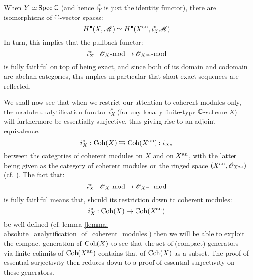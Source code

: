         \begin{corollary} \label{coro: GAGA_cohomological_comparison}
            When $Y \simeq \operatorname{Spec} \mathbb{C}$ (and hence $i_Y^*$ is just the identity functor), there are isomorphisms of $\mathbb{C}$-vector spaces:
                $$H^{\bullet}(X, \mathscr{M}) \simeq H^{\bullet}(X^{\mathrm{an}}, i_X^*\mathscr{M})$$
            In turn, this implies that the pullback functor:
                $$i_X^*: \mathscr{O}_X\text{-}\mathrm{mod} \to \mathscr{O}_{X^{\mathrm{an}}}\text{-}\mathrm{mod}$$
            is fully faithful on top of being exact, and since both of its domain and codomain are abelian categories, this implies in particular that short exact sequences are reflected. 
        \end{corollary}

        We shall now see that when we restrict our attention to coherent modules only, the module analytification functor $i_X^*$ (for any locally finite-type $\mathbb{C}$-scheme $X$) will furthermore be essentially surjective, thus giving rise to an adjoint equivalence:
            $$i_X^*: \mathrm{Coh}(X) \leftrightarrows \mathrm{Coh}(X^{\mathrm{an}}): i_{X *}$$
        between the categories of coherent modules on $X$ and on $X^{\mathrm{an}}$, with the latter being given as the category of coherent modules on the ringed space $(X^{\mathrm{an}}, \mathscr{O}_{X^{\mathrm{an}}})$ (cf. \cite[\href{https://stacks.math.columbia.edu/tag/01BU}{Tag 01BU}]{stacks-project}). The fact that:
            $$i_X^*: \mathscr{O}_X\text{-}\mathrm{mod} \to \mathscr{O}_{X^{\mathrm{an}}}\text{-}\mathrm{mod}$$
        is fully faithful means that, should its restriction down to coherent modules:
           $$i_X^*: \mathrm{Coh}(X) \to \mathrm{Coh}(X^{\mathrm{an}})$$
       be well-defined (cf. lemma \ref{lemma: absolute_analytification_of_coherent_modules}) then we will be able to exploit the compact generation of $\mathrm{Coh}(X)$ to see that the set of (compact) generators via finite colimits of $\mathrm{Coh}(X^{\mathrm{an}})$ contains that of $\mathrm{Coh}(X)$ as a subset. The proof of essential surjectivity then reduces down to a proof of essential surjectivity on these generators. 
